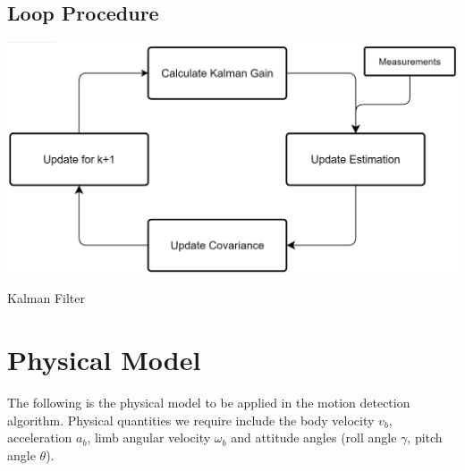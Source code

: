 \documentclass[12pt]{article}
\begin{document}
    \subsection{Loop Procedure}
    \includegraphics[width = 0.9\linewidth]{Kalman Loop.png} \par
    \begin{algorithm}[H]
        \label{KalmanLoop}
        \caption{Kalman Filter}
        \begin{algorithmic}
            \ENDWHILE
        \end{algorithmic}
    \end{algorithm}
    \section{Physical Model}
    The following is the physical model to be applied in the motion detection algorithm. Physical quantities we require include the body velocity $v_b$, acceleration $a_b$, limb angular velocity $\omega_b$ and attitude angles (roll angle $\gamma$, pitch angle $\theta$).
\end{document}
